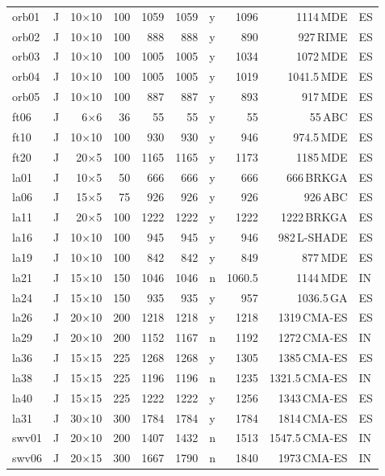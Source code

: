 {\begin{longtable}{llrrrrcrrl}
orb01 & J & 10$\times$10 & 100 & 1059 & 1059 & y & 1096 & 1114\,MDE & ES \\
orb02 & J & 10$\times$10 & 100 & 888 & 888 & y & 890 & 927\,RIME & ES \\
orb03 & J & 10$\times$10 & 100 & 1005 & 1005 & y & 1034 & 1072\,MDE & ES \\
orb04 & J & 10$\times$10 & 100 & 1005 & 1005 & y & 1019 & 1041.5\,MDE & ES \\
orb05 & J & 10$\times$10 & 100 & 887 & 887 & y & 893 & 917\,MDE & ES \\
ft06 & J & 6$\times$6 & 36 & 55 & 55 & y & 55 & 55\,ABC & ES \\
ft10 & J & 10$\times$10 & 100 & 930 & 930 & y & 946 & 974.5\,MDE & ES \\
ft20 & J & 20$\times$5 & 100 & 1165 & 1165 & y & 1173 & 1185\,MDE & ES \\
la01 & J & 10$\times$5 & 50 & 666 & 666 & y & 666 & 666\,BRKGA & ES \\
la06 & J & 15$\times$5 & 75 & 926 & 926 & y & 926 & 926\,ABC & ES \\
la11 & J & 20$\times$5 & 100 & 1222 & 1222 & y & 1222 & 1222\,BRKGA & ES \\
la16 & J & 10$\times$10 & 100 & 945 & 945 & y & 946 & 982\,L-SHADE & ES \\
la19 & J & 10$\times$10 & 100 & 842 & 842 & y & 849 & 877\,MDE & ES \\
la21 & J & 15$\times$10 & 150 & 1046 & 1046 & n & 1060.5 & 1144\,MDE & IN \\
la24 & J & 15$\times$10 & 150 & 935 & 935 & y & 957 & 1036.5\,GA & ES \\
la26 & J & 20$\times$10 & 200 & 1218 & 1218 & y & 1218 & 1319\,CMA-ES & ES \\
la29 & J & 20$\times$10 & 200 & 1152 & 1167 & n & 1192 & 1272\,CMA-ES & IN \\
la36 & J & 15$\times$15 & 225 & 1268 & 1268 & y & 1305 & 1385\,CMA-ES & ES \\
la38 & J & 15$\times$15 & 225 & 1196 & 1196 & n & 1235 & 1321.5\,CMA-ES & IN \\
la40 & J & 15$\times$15 & 225 & 1222 & 1222 & y & 1256 & 1343\,CMA-ES & ES \\
la31 & J & 30$\times$10 & 300 & 1784 & 1784 & y & 1784 & 1814\,CMA-ES & ES \\
swv01 & J & 20$\times$10 & 200 & 1407 & 1432 & n & 1513 & 1547.5\,CMA-ES & IN \\
swv06 & J & 20$\times$15 & 300 & 1667 & 1790 & n & 1840 & 1973\,CMA-ES & IN \\

\end{longtable}}
